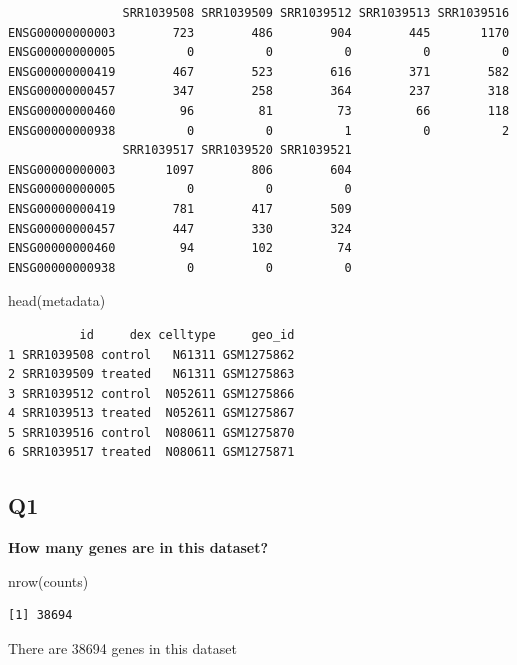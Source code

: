 \documentclass[
  letterpaper,
  DIV=11,
  numbers=noendperiod]{scrartcl}
\newenvironment{Shaded}{\begin{snugshade}}{\end{snugshade}}
\newcommand{\FunctionTok}[1]{\textcolor[rgb]{0.28,0.35,0.67}{#1}}
\newcommand{\NormalTok}[1]{\textcolor[rgb]{0.00,0.23,0.31}{#1}}
\begin{document}
\begin{verbatim}
                SRR1039508 SRR1039509 SRR1039512 SRR1039513 SRR1039516
ENSG00000000003        723        486        904        445       1170
ENSG00000000005          0          0          0          0          0
ENSG00000000419        467        523        616        371        582
ENSG00000000457        347        258        364        237        318
ENSG00000000460         96         81         73         66        118
ENSG00000000938          0          0          1          0          2
                SRR1039517 SRR1039520 SRR1039521
ENSG00000000003       1097        806        604
ENSG00000000005          0          0          0
ENSG00000000419        781        417        509
ENSG00000000457        447        330        324
ENSG00000000460         94        102         74
ENSG00000000938          0          0          0
\end{verbatim}

\begin{Shaded}
\begin{Highlighting}[]
\FunctionTok{head}\NormalTok{(metadata)}
\end{Highlighting}
\end{Shaded}

\begin{verbatim}
          id     dex celltype     geo_id
1 SRR1039508 control   N61311 GSM1275862
2 SRR1039509 treated   N61311 GSM1275863
3 SRR1039512 control  N052611 GSM1275866
4 SRR1039513 treated  N052611 GSM1275867
5 SRR1039516 control  N080611 GSM1275870
6 SRR1039517 treated  N080611 GSM1275871
\end{verbatim}

\hypertarget{q1}{%
\subsection{\texorpdfstring{\textbf{Q1}}{Q1}}\label{q1}}

\textbf{How many genes are in this dataset?}

\begin{Shaded}
\begin{Highlighting}[]
\FunctionTok{nrow}\NormalTok{(counts)}
\end{Highlighting}
\end{Shaded}

\begin{verbatim}
[1] 38694
\end{verbatim}

There are 38694 genes in this dataset
\end{document}

